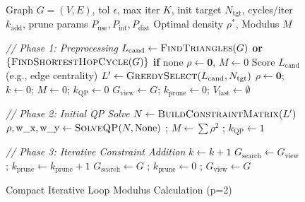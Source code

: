 \documentclass{article}
\begin{document}
\begin{figure*}[htbp!] %
    \centering
        \begin{algorithm}[H] %
            \caption{Compact Iterative Loop Modulus Calculation (p=2)}
            \label{alg:loop_mod}
            \begin{algorithmic}[1]
                \Require Graph $G=(V, E)$, tol $\epsilon$, max iter $K$, init target $N_{\text{tgt}}$, cycles/iter $k_{\text{add}}$, prune params $P_{\text{use}}, P_{\text{int}}, P_{\text{dist}}$
                \Ensure Optimal density $\rho^*$, Modulus $M$

                \Statex \textit{// Phase 1: Preprocessing}
                \State $L_{\text{cand}} \gets \Call{FindTriangles}{G}$ \textbf{or} $\{\Call{FindShortestHopCycle}{G}\}$ \textbf{if} none
                 \Return $\rho \gets \mathbf{0}$, $M \gets 0$ \EndIf
                \State Score $L_{\text{cand}}$ (e.g., edge centrality)
                \State $L' \gets \Call{GreedySelect}{L_{\text{cand}}, N_{\text{tgt}}}$
                \State $\rho \gets \mathbf{0}$; $k \gets 0$; $M \gets 0$; $k_{\text{QP}} \gets 0$
                \State $G_{\text{view}} \gets G$; $k_{\text{prune}} \gets 0$; $V_{\text{last}} \gets \emptyset$

                \Statex \textit{// Phase 2: Initial QP Solve}
                \State $N \gets \Call{BuildConstraintMatrix}{L'}$
                \State $\rho, \text{w\_x}, \text{w\_y} \gets \Call{SolveQP}{N, \text{None}}$ ; $M \gets \sum \rho^2$ ; $k_{\text{QP}} \gets 1$

                \Statex \textit{// Phase 3: Iterative Constraint Addition}
                    \State $k \gets k + 1$
                     \label{line:prune_check_compact} 
                         \State $G_{\text{search}} \gets G_{\text{view}}$ ; $k_{\text{prune}} \gets k_{\text{prune}} + 1$
                    \Else {}
                        \State $G_{\text{search}} \gets G$ ; $k_{\text{prune}} \gets 0$ ; $G_{\text{view}} \gets G$ \label{line:prune_logic_compact}
                    \EndIf


\end{algorithmic}
\end{algorithm}
\end{figure*}
\end{document}
